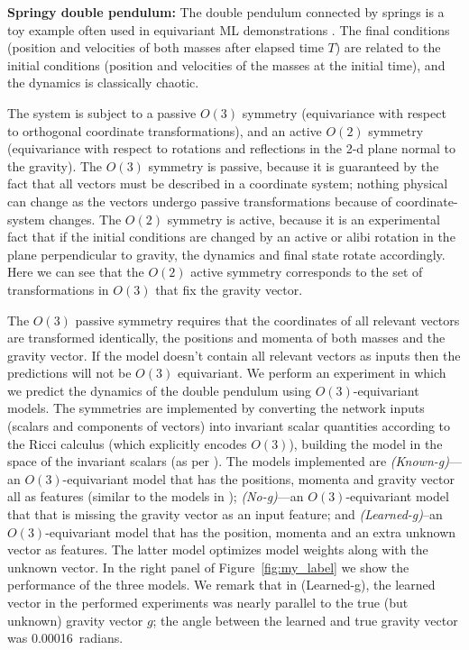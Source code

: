 \documentclass{article}
\theoremstyle{plain}
\theoremstyle{definition}
\theoremstyle{remark}
\newcommand{\figref}[1]{Figure~\ref{#1}}
\newcommand{\bernhard}[1]{ \textcolor{red}{\textbf{~B: #1}}}
\begin{document}
\textbf{Springy double pendulum:}
The double pendulum connected by springs is a toy example often used in equivariant ML demonstrations \cite{finzi2021practical,yao2021simple, villar2022dimensionless}. 
The final conditions (position and velocities of both masses after elapsed time $T$) are related to the initial conditions (position and velocities of the masses at the initial time), and the dynamics is classically chaotic.

The system is subject to a passive $O(3)$ symmetry (equivariance with respect to orthogonal coordinate transformations), and an active $O(2)$ symmetry (equivariance with respect to rotations and reflections in the 2-d plane normal to the gravity). 
The $O(3)$ symmetry is passive, because it is guaranteed by the fact that all vectors must be described in a coordinate system; nothing physical can change as the vectors undergo passive transformations because of coordinate-system changes.
The $O(2)$ symmetry is active, because it is an experimental fact that if the initial conditions are changed by an active or alibi rotation in the plane perpendicular to gravity, the dynamics and final state rotate accordingly.
Here we can see that the $O(2)$ active symmetry corresponds to the set of transformations in $O(3)$ that fix the gravity vector. 

The $O(3)$ passive symmetry requires that the coordinates of all relevant vectors are transformed identically, the positions and momenta of both masses and the gravity vector. If the model doesn't contain all relevant vectors as inputs then the predictions will not be $O(3)$ equivariant. We perform an experiment in which we predict the dynamics of the double pendulum using $O(3)$-equivariant models. The symmetries are implemented by converting the network inputs (scalars and components of vectors) into invariant scalar quantities according to the Ricci calculus (which explicitly encodes $O(3)$), building the model in the space of the invariant scalars (as per \citealt{villar2021scalars}). The models implemented are \textsl{(Known-g)}---an $O(3)$-equivariant model that has the positions, momenta and gravity vector all as features (similar to the models in \citealt{villar2021scalars, yao2021simple}); \textsl{(No-g)}---an $O(3)$-equivariant model that that is missing the gravity vector as an input feature; and \textsl{(Learned-g)}\---an $O(3)$-equivariant model that has the position, momenta and an extra unknown vector as features. The latter model optimizes model weights along with the unknown vector. 
In the right panel of \figref{fig:my_label} we show the performance of the three models.
We remark that in (Learned-g), the learned vector in the performed experiments was nearly parallel to the true (but unknown) gravity vector $g$; the angle between the learned and true gravity vector was 0.00016~radians.
\end{document}
